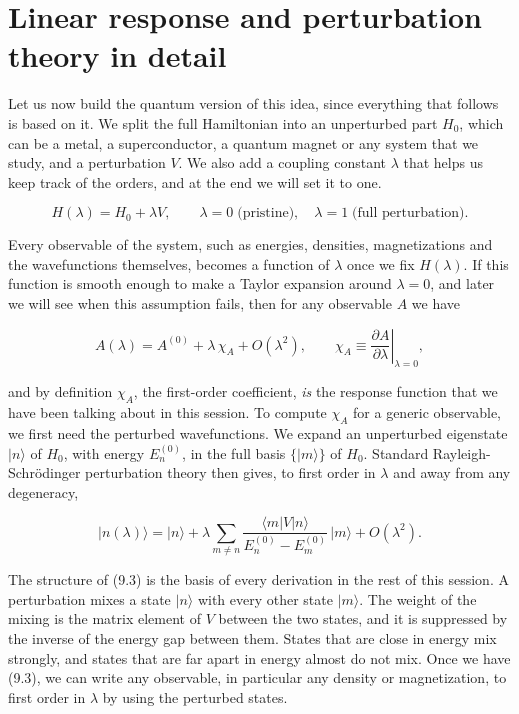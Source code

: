 \section{Linear response and perturbation theory in detail}

Let us now build the quantum version of this idea, since everything that follows is based on it. We split the full Hamiltonian into an unperturbed part $H_0$, which can be a metal, a
superconductor, a quantum magnet or any system that we study, and a perturbation $V$. We also add a
coupling constant $\lambda$ that helps us keep track of the orders, and at the end we will set it
to one.

\begin{equation}
H(\lambda) = H_0 + \lambda V, \qquad \lambda = 0 \;\text{(pristine)}, \quad \lambda = 1\;\text{(full perturbation)}.
\end{equation}

Every observable of the system, such as energies, densities, magnetizations and the wavefunctions
themselves, becomes a function of $\lambda$ once we fix $H(\lambda)$. If this function is smooth
enough to make a Taylor expansion around $\lambda=0$, and later we will see when this assumption
fails, then for any observable $A$ we have

\begin{equation*}
A(\lambda) = A^{(0)} + \lambda\, \chi_A + O(\lambda^2), \qquad
\chi_A \equiv \left.\frac{\partial A}{\partial \lambda}\right|_{\lambda=0},
\end{equation*}

and by definition $\chi_A$, the first-order coefficient, \emph{is} the response function that we have
been talking about in this session. To compute $\chi_A$ for a generic observable, we first need the
perturbed wavefunctions. We expand an unperturbed eigenstate $|n\rangle$ of $H_0$, with energy
$E_n^{(0)}$, in the full basis $\{|m\rangle\}$ of $H_0$. Standard Rayleigh-Schrödinger perturbation
theory then gives, to first order in $\lambda$ and away from any degeneracy,

\begin{equation}
|n(\lambda)\rangle = |n\rangle + \lambda \sum_{m \neq n} \frac{\langle m|V|n\rangle}{E_n^{(0)} - E_m^{(0)}} \, |m\rangle + O(\lambda^2).
\end{equation}

The structure of (9.3) is the basis of every derivation in the rest of this session. A perturbation mixes a state $|n\rangle$ with every other state $|m\rangle$.
The weight of the mixing is the matrix element of $V$ between the two states, and it is suppressed by
the inverse of the energy gap between them. States that are close in energy mix strongly, and states
that are far apart in energy almost do not mix. Once we have (9.3), we can write any observable, in
particular any density or magnetization, to first order in $\lambda$ by using the perturbed states.

